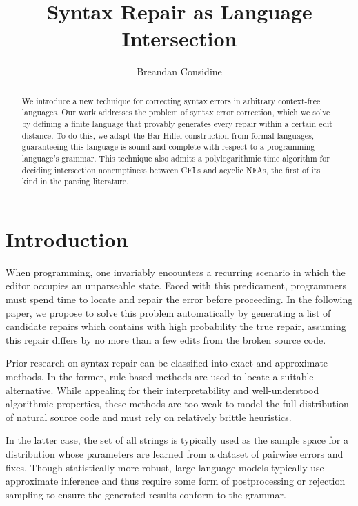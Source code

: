 \documentclass[sigplan,review,acmsmall,nonacm,screen,anonymous]{acmart}\settopmatter{printfolios=false,printccs=false,printacmref=false}
\begin{document}
%
\title{Syntax Repair as Language Intersection}
%
\begin{abstract}
We introduce a new technique for correcting syntax errors in arbitrary context-free languages. Our work addresses the problem of syntax error correction, which we solve by defining a finite language that provably generates every repair within a certain edit distance. To do this, we adapt the Bar-Hillel construction from formal languages, guaranteeing this language is sound and complete with respect to a programming language's grammar. This technique also admits a polylogarithmic time algorithm for deciding intersection nonemptiness between CFLs and acyclic NFAs, the first of its kind in the parsing literature.
\end{abstract}

\author{Breandan Considine}

\maketitle

\section{Introduction}

When programming, one invariably encounters a recurring scenario in which the editor occupies an unparseable state. Faced with this predicament, programmers must spend time to locate and repair the error before proceeding. In the following paper, we propose to solve this problem automatically by generating a list of candidate repairs which contains with high probability the true repair, assuming this repair differs by no more than a few edits from the broken source code.

Prior research on syntax repair can be classified into exact and approximate methods. In the former, rule-based methods are used to locate a suitable alternative. While appealing for their interpretability and well-understood algorithmic properties, these methods are too weak to model the full distribution of natural source code and must rely on relatively brittle heuristics.

In the latter case, the set of all strings is typically used as the sample space for a distribution whose parameters are learned from a dataset of pairwise errors and fixes. Though statistically more robust, large language models typically use approximate inference and thus require some form of postprocessing or rejection sampling to ensure the generated results conform to the grammar.
\end{document}
